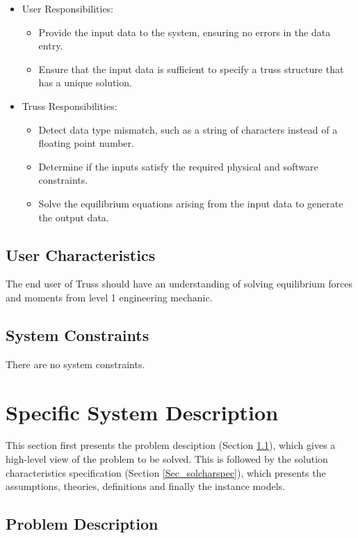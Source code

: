 \documentclass[12pt]{article}
\begin{document}
\begin{itemize}
\item User Responsibilities:
\begin{itemize}
\item Provide the input data to the system, ensuring no errors in the data 
entry.
\item Ensure that the input data is sufficient to specify a truss structure 
that has a unique solution.
\end{itemize}
\item Truss Responsibilities:
\begin{itemize}
\item Detect data type mismatch, such as a string of characters instead of a
  floating point number.
\item Determine if the inputs satisfy the required physical and software 
constraints.
\item Solve the equilibrium equations arising from the input data to generate 
the output data.
\end{itemize}
\end{itemize}

\subsection{User Characteristics} \label{SecUserCharacteristics}
The end user of Truss should have an understanding of solving equilibrium 
forces and moments from level 1 engineering mechanic.

\subsection{System Constraints}
There are no system constraints.

\section{Specific System Description}

This section first presents the problem desciption (Section \ref{Sec_pd}), 
which gives a high-level view of the problem to be solved.  This is followed by 
the solution characteristics specification (Section \ref{Sec_solcharspec}), 
which presents the assumptions, theories, definitions and finally the instance 
models.  

\subsection{Problem Description} \label{Sec_pd}
\end{document}
